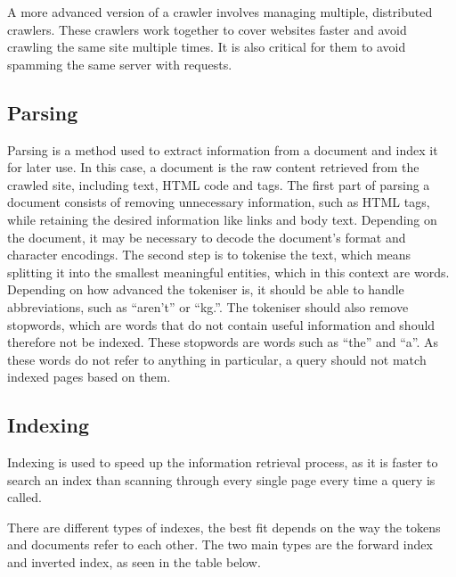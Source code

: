 A more advanced version of a crawler involves managing multiple, distributed
crawlers. These crawlers work together to cover websites faster and avoid
crawling the same site multiple times. It is also critical for them to avoid
spamming the same server with requests.


\subsection{Parsing} \label{sec:parsing}
Parsing is a method used to extract information from a document and index it for
later use. In this case, a document is the raw content retrieved from the
crawled site, including text, \ac{HTML} code and tags.
The first part of parsing a document consists of removing unnecessary
information, such as \ac{HTML} tags, while retaining the desired information like
links and body text. Depending on the document, it may be necessary to decode
the document's format and character encodings.
The second step is to tokenise the text, which means splitting it into the
smallest meaningful entities, which in this context are words. Depending on how
advanced the tokeniser is, it should be able to handle abbreviations, such as
``aren't'' or ``kg.''. The tokeniser should also remove stopwords, which are
words that do not contain useful information and should therefore not be
indexed. These stopwords are words such as ``the'' and ``a''. As these words do
not refer to anything in particular, a query should not match indexed pages
based on them.

\subsection{Indexing}
Indexing is used to speed up the information retrieval process, as it is faster
to search an index than scanning through every single page every time a query
is called.

There are different types of indexes, the best fit depends on the way the tokens
and documents refer to each other. The two main types are the forward index and
inverted index, as seen in the table below.


